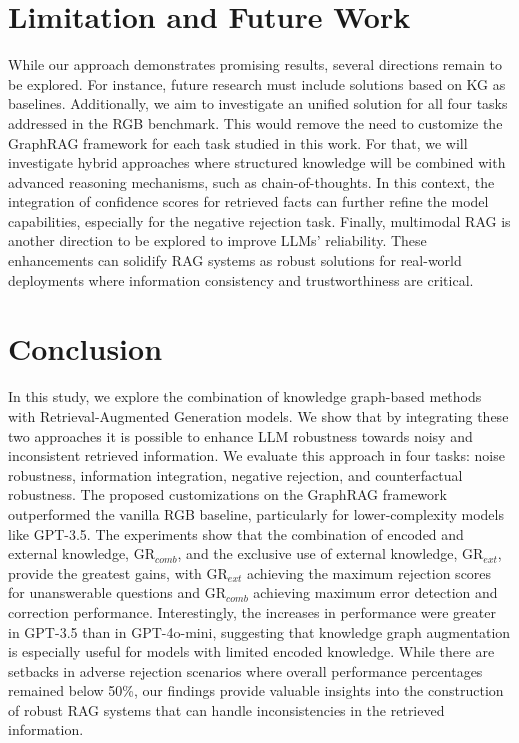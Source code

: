 \documentclass[letterpaper, 10 pt, conference]{ieeeconf}  %
\begin{document}
\section{Limitation and Future Work}
\label{sec:limitation}
While our approach demonstrates promising results, several directions remain to be explored. For instance, future research must include solutions based on KG as baselines. Additionally, we aim to investigate an unified solution for all four tasks addressed in the RGB benchmark. This would remove the need to customize the GraphRAG framework for each task studied in this work. For that, we will investigate hybrid approaches where structured knowledge will be combined with advanced reasoning mechanisms, such as chain-of-thoughts. In this context, the integration of confidence scores for retrieved facts can further refine the model capabilities, especially for the  negative rejection task. Finally, multimodal RAG is another direction to be explored to improve LLMs' reliability. These enhancements can solidify RAG systems as robust solutions for real-world deployments where information consistency and trustworthiness are critical.

\section{Conclusion}
\label{sec:conclusion}
In this study, we explore the combination of knowledge graph-based methods with Retrieval-Augmented Generation models. We show that by integrating these two approaches it is possible to enhance LLM robustness towards noisy and inconsistent retrieved information. We evaluate this approach in four tasks: noise robustness, information integration, negative rejection, and counterfactual robustness. The proposed customizations on the GraphRAG framework outperformed the vanilla RGB baseline, particularly for lower-complexity models like GPT-3.5. The experiments show that the combination of encoded and external knowledge, GR$_{comb}$, and the exclusive use of external knowledge, GR$_{ext}$, provide the greatest gains, with GR$_{ext}$ achieving the maximum rejection scores for unanswerable questions and GR$_{comb}$ achieving maximum error detection and correction performance. Interestingly, the increases in performance were greater in GPT-3.5 than in GPT-4o-mini, suggesting that knowledge graph augmentation is especially useful for models with limited encoded knowledge. While there are setbacks in adverse rejection scenarios where overall performance percentages remained below 50\%, our findings provide valuable insights into the construction of robust RAG systems that can handle inconsistencies in the retrieved information. %
\end{document}
